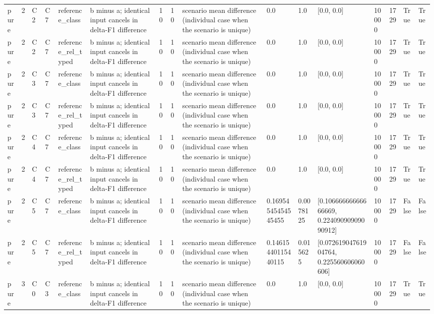 \begin{tabular}{llllllllllllllll}
pure & 2 & C2 & C7 & reference\_class & b minus a; identical input cancels in delta-F1 difference & 10 & 10 & scenario mean difference (individual case when the scenario is unique) & 0.0 & 1.0 & [0.0, 0.0] & 10000 & 1729 & True & True \\
pure & 2 & C2 & C7 & reference\_rel\_typed & b minus a; identical input cancels in delta-F1 difference & 10 & 10 & scenario mean difference (individual case when the scenario is unique) & 0.0 & 1.0 & [0.0, 0.0] & 10000 & 1729 & True & True \\
pure & 2 & C3 & C7 & reference\_class & b minus a; identical input cancels in delta-F1 difference & 10 & 10 & scenario mean difference (individual case when the scenario is unique) & 0.0 & 1.0 & [0.0, 0.0] & 10000 & 1729 & True & True \\
pure & 2 & C3 & C7 & reference\_rel\_typed & b minus a; identical input cancels in delta-F1 difference & 10 & 10 & scenario mean difference (individual case when the scenario is unique) & 0.0 & 1.0 & [0.0, 0.0] & 10000 & 1729 & True & True \\
pure & 2 & C4 & C7 & reference\_class & b minus a; identical input cancels in delta-F1 difference & 10 & 10 & scenario mean difference (individual case when the scenario is unique) & 0.0 & 1.0 & [0.0, 0.0] & 10000 & 1729 & True & True \\
pure & 2 & C4 & C7 & reference\_rel\_typed & b minus a; identical input cancels in delta-F1 difference & 10 & 10 & scenario mean difference (individual case when the scenario is unique) & 0.0 & 1.0 & [0.0, 0.0] & 10000 & 1729 & True & True \\
pure & 2 & C5 & C7 & reference\_class & b minus a; identical input cancels in delta-F1 difference & 10 & 10 & scenario mean difference (individual case when the scenario is unique) & 0.16954545454545455 & 0.0078125 & [0.10666666666666669, 0.22409090909090912] & 10000 & 1729 & False & False \\
pure & 2 & C5 & C7 & reference\_rel\_typed & b minus a; identical input cancels in delta-F1 difference & 10 & 10 & scenario mean difference (individual case when the scenario is unique) & 0.14615440115440115 & 0.015625 & [0.07261904761904764, 0.225560606060606] & 10000 & 1729 & False & False \\
pure & 3 & C0 & C3 & reference\_class & b minus a; identical input cancels in delta-F1 difference & 10 & 10 & scenario mean difference (individual case when the scenario is unique) & 0.0 & 1.0 & [0.0, 0.0] & 10000 & 1729 & True & True \\

\end{tabular}
